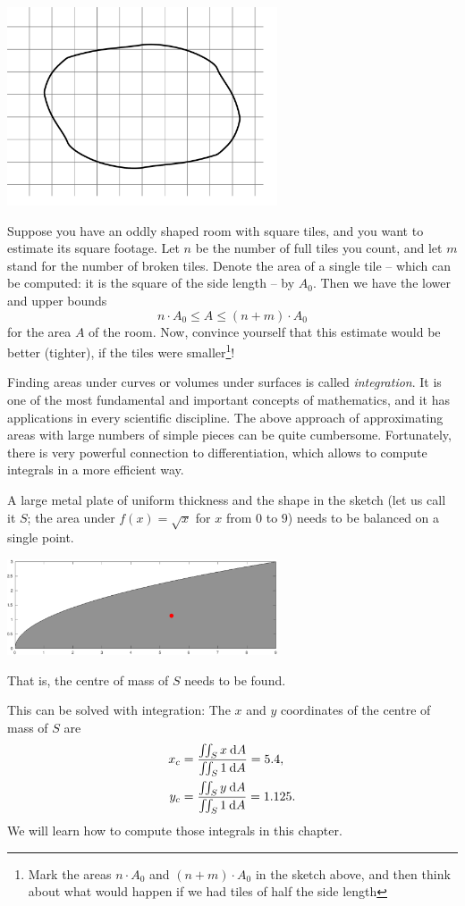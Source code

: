 \begin{center}
\includegraphics[width=0.6\textwidth]{./Figures/tiled_room.pdf}
\end{center}

Suppose you have an oddly shaped room with square tiles, and you want to estimate its square footage. Let $n$ be the number of full tiles you count, and let $m$ stand for the number of broken tiles. Denote the area of a single tile -- which can be computed: it is the square of the side length -- by $A_0$. Then we have the lower and upper bounds
\[n \cdot A_0 \leq A \leq (n+m) \cdot A_0\]
for the area $A$ of the room. Now, convince yourself that this estimate would be better (tighter), if the tiles were smaller\footnote{Mark the areas $n \cdot A_0$ and $(n+m) \cdot A_0$ in the sketch above, and then think about what would happen if we had tiles of half the side length}!

Finding areas under curves or volumes under surfaces is called \emph{integration}. It is one of the most fundamental and important concepts of mathematics, and it has applications in every scientific discipline. The above approach of approximating areas with large numbers of simple pieces can be quite cumbersome. Fortunately, there is very powerful connection to differentiation, which allows to compute integrals in a more efficient way.

\begin{application}
A large metal plate of uniform thickness and the shape in the sketch (let us call it $S$; the area under $f(x)=\sqrt{x}$ for $x$ from $0$ to $9$) needs to be balanced on a single point.
\begin{center}
	\includegraphics[width=0.6\textwidth]{./Figures/centre_of_mass.pdf}
\end{center}
That is, the centre of mass of $S$ needs to be found.

This can be solved with integration: The $x$ and $y$ coordinates of the centre of mass of $S$ are
\begin{align*}
x_c &= \frac{\iint_S x \: \mathrm{d} A}{\iint_S 1 \: \mathrm{d} A} = 5.4, \\
y_c &= \frac{\iint_S y \: \mathrm{d} A}{\iint_S 1 \: \mathrm{d} A} = 1.125.
\end{align*}
We will learn how to compute those integrals in this chapter.
\end{application}


